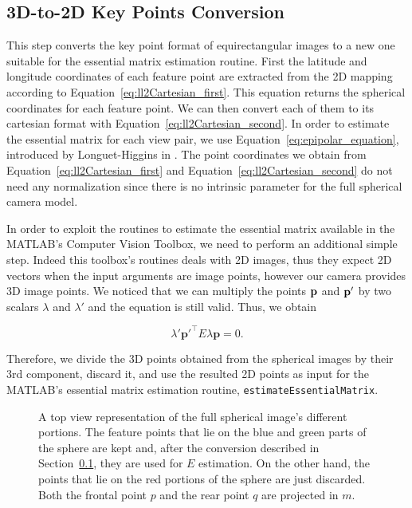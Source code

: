 \subsection{3D-to-2D Key Points Conversion}
\label{sec:keypoints_conversion}
This step converts the key point format of equirectangular images to a new one 
suitable for the essential matrix estimation routine.
First the latitude and longitude coordinates of each feature point are 
extracted from the 2D mapping according to  
Equation~\ref{eq:ll2Cartesian_first}.
This equation returns the spherical coordinates for each feature point. 
We can then convert each of them to its cartesian format with 
Equation~\ref{eq:ll2Cartesian_second}. In order to estimate the essential 
matrix for each view pair, we use Equation~\ref{eq:epipolar_equation}, 
introduced by Longuet-Higgins in \cite{longuet1981computer}.
The point coordinates we obtain from Equation~\ref{eq:ll2Cartesian_first} and
Equation~\ref{eq:ll2Cartesian_second} do not need any normalization since there
is no intrinsic parameter for the full spherical camera model.

In order to exploit the routines to estimate the essential matrix available 
in the MATLAB's Computer Vision Toolbox, we need to perform an additional simple 
step.
Indeed this toolbox's routines deals with 2D images, thus they expect 
2D vectors when the input arguments are image points, however our camera
provides 3D image points.
We noticed that we can multiply the points $\mathbf{p}$
and $\mathbf{p}'$ by two 
scalars ${\lambda}$ and 
${\lambda}'$ and the equation is still valid. Thus, we obtain

\begin{equation*}
\lambda'\mathbf{p}'^\top E\lambda\mathbf{p} = 0 \text{.}
\end{equation*}

Therefore, we divide the 3D points obtained from the spherical images by their 
3rd component, discard it, and use the resulted 2D points as input for the 
MATLAB's essential matrix estimation routine, {\tt estimateEssentialMatrix}.

\begin{figure}
    \centering
    \def\svgwidth{0.8\columnwidth}
    
    \caption{A top view representation of the full spherical image's 
    different portions.
    The feature points that lie on the blue and green parts of the sphere are kept and,
    after the conversion described in Section~\ref{sec:keypoints_conversion},
    they are used for $E$ estimation. On the other hand, the points that lie
    on the red portions of the sphere are just discarded.
    Both the frontal point $p$ and the rear point $q$ are projected in $m$.}
	\label{fig:sphere_division}
\end{figure}


